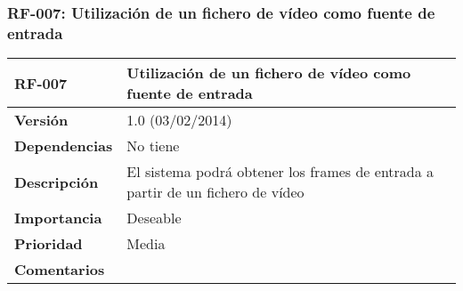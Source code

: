 \subsubsection*{RF-007: Utilización de un fichero de vídeo como fuente de entrada}
\begin{tabular}{|p{3cm}|p{11.5cm}|}
\hline
\textbf{RF-007}         & \textbf{Utilización de un fichero de vídeo como fuente de entrada}                                           \\ \hline
\textbf{Versión}        & 1.0 (03/02/2014)                                                                                             \\ \hline
\textbf{Dependencias}   & No tiene                                                                                                     \\ \hline
\textbf{Descripción}    & El sistema podrá obtener los frames de entrada a partir de un fichero de vídeo                               \\ \hline
\textbf{Importancia}    & Deseable                                                                                                     \\ \hline
\textbf{Prioridad}      & Media                                                                                                        \\ \hline
\textbf{Comentarios}    &                                                                                                              \\ \hline
\end{tabular}

